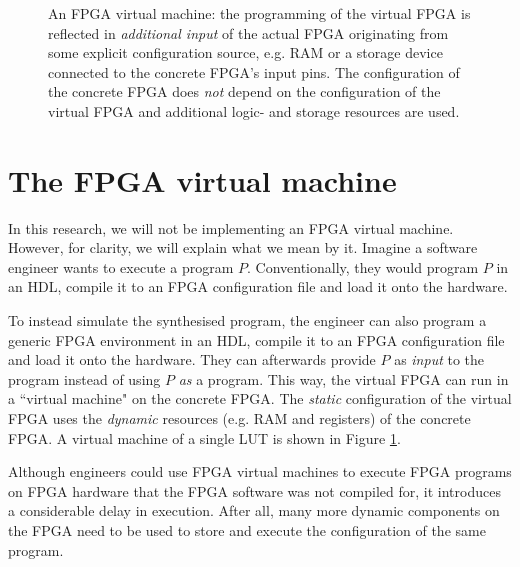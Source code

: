 \begin{figure}
    \caption{An FPGA virtual machine: the programming of the virtual FPGA is reflected in \textit{additional input} of the actual FPGA originating from some explicit configuration source, e.g. RAM or a storage device connected to the concrete FPGA's input pins. The configuration of the concrete FPGA does \textit{not} depend on the configuration of the virtual FPGA and additional logic- and storage resources are used.}
    \label{fig:simulation}
\end{figure}

\section{The FPGA virtual machine}
\label{sec:simulation}
In this research, we will not be implementing an FPGA virtual machine. However, for clarity, we will explain what we mean by it. Imagine a software engineer wants to execute a program $P$. Conventionally, they would program $P$ in an HDL, compile it to an FPGA configuration file and load it onto the hardware.

To instead simulate the synthesised program, the engineer can also program a generic FPGA environment in an HDL, compile it to an FPGA configuration file and load it onto the hardware. They can afterwards provide $P$ as \textit{input} to the program instead of using $P$ \textit{as} a program. This way, the virtual FPGA can run in a ``virtual machine" on the concrete FPGA. The \textit{static} configuration of the virtual FPGA uses the \textit{dynamic} resources (e.g. RAM and registers) of the concrete FPGA. A virtual machine of a single LUT is shown in Figure \ref{fig:simulation}.

Although engineers could use FPGA virtual machines to execute FPGA programs on FPGA hardware that the FPGA software was not compiled for, it introduces a considerable delay in execution. After all, many more dynamic components on the FPGA need to be used to store and execute the configuration of the same program.	



